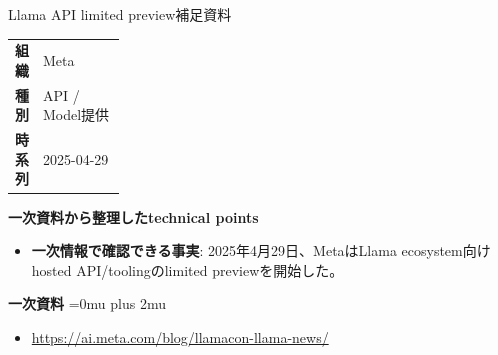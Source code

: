 \begin{technicalnote}{Llama API limited preview}{補足資料}
\begingroup
\begin{tabularx}{\linewidth}{@{}>{\bfseries}p{0.22\linewidth}X@{}}
組織 & Meta \\
種別 & API / Model提供 \\
時系列 & 2025-04-29 \\
\end{tabularx}
\smallskip
{\bfseries 一次資料から整理したtechnical points}
\begin{itemize}[leftmargin=1.5em,itemsep=0.35em]
\item \textbf{一次情報で確認できる事実}: 2025年4月29日、MetaはLlama ecosystem向けhosted API/toolingのlimited previewを開始した。
\end{itemize}
\begin{samepage}
{\bfseries 一次資料}
\begingroup\sloppy
\Urlmuskip=0mu plus 2mu\relax
\begin{itemize}[leftmargin=1.5em,itemsep=0.25em]
\item {\scriptsize\url{https://ai.meta.com/blog/llamacon-llama-news/}}
\end{itemize}
\endgroup
\end{samepage}
\endgroup
\end{technicalnote}
\medskip
